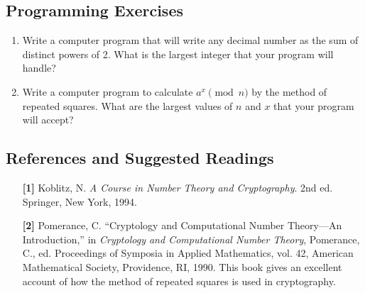 \documentclass[12pt,reqno]{amsart}
\begin{document}
 
\subsection*{Programming Exercises}
 
 
{\small
\begin{enumerate}
 
 
\item
Write a computer program that will write any decimal number as the sum
of distinct powers of 2.  What is the largest integer that your
program will handle?
 
 
\item
Write a computer program to calculate $a^x \pmod{ n}$ by the method of
repeated squares.  What are the largest values of $n$ and $x$ that
your program will accept?  
 
 
\end{enumerate}
}
 
 
\subsection*{References and Suggested Readings}
 
 
{\small
\begin{itemize}
 
\item[\textbf{[1]}] %
Koblitz, N. \textit{A Course in Number Theory and Cryptography}. 2nd ed.
Springer, New York, 1994.  
 
 
\item[\textbf{[2]}]
Pomerance, C. ``Cryptology and Computational Number Theory---An
Introduction,'' in \textit{Cryptology and Computational Number Theory},
Pomerance, C., ed. Proceedings of Symposia in Applied Mathematics,
vol. 42, American Mathematical Society, Providence, RI, 1990.  This
book gives an excellent account of how the method of repeated squares
is used in cryptography. 
 
\end{itemize}
}
 
\end{document}
